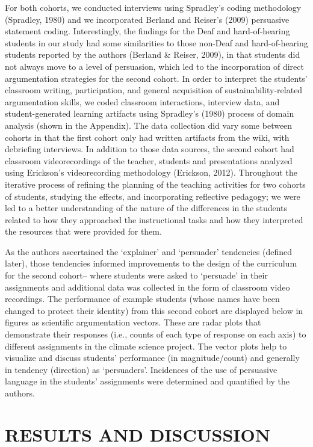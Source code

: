 \documentclass[11.5pt]{sig-alternate} %
\begin{document}
\begin{large}
For both cohorts, we conducted interviews using Spradley’s coding methodology (Spradley, 1980) and we incorporated Berland and Reiser’s (2009) persuasive statement coding. Interestingly, the findings for the Deaf and hard-of-hearing students in our study had some similarities to those non-Deaf and hard-of-hearing students reported by the authors (Berland \& Reiser, 2009), in that students did not always move to a level of persuasion, which led to the incorporation of direct argumentation strategies for the second cohort. In order to interpret the students’ classroom writing, participation, and general acquisition of sustainability-related argumentation skills, we coded classroom interactions, interview data, and student-generated learning artifacts using Spradley’s (1980) process of domain analysis (shown in the Appendix). The data collection did vary some between cohorts in that the first cohort only had written artifacts from the wiki, with debriefing interviews. In addition to those data sources, the second cohort had classroom videorecordings of the teacher, students and presentations analyzed using Erickson’s videorecording methodology (Erickson, 2012). Throughout the iterative process of refining the planning of the teaching activities for two cohorts of students, studying the effects, and incorporating reflective pedagogy; we were led to a better understanding of the nature of the differences in the students related to how they approached the instructional tasks and how they interpreted the resources that were provided for them. 

As the authors ascertained the ‘explainer’ and ‘persuader’ tendencies (defined later), those tendencies informed improvements to the design of the curriculum for the second cohort– where students were asked to ‘persuade’ in their assignments and additional data was collected in the form of classroom video recordings. The performance of example students (whose names have been changed to protect their identity) from this second cohort are displayed below in figures as scientific argumentation vectors. These are radar plots that demonstrate their responses (i.e., counts of each type of response on each axis) to different assignments in the climate science project. The vector plots help to visualize and discuss students’ performance (in magnitude/count) and generally in tendency (direction) as ‘persuaders’. Incidences of the use of persuasive language in the students’ assignments were determined and quantified by the authors.

\section*{RESULTS AND DISCUSSION}


\end{large}
\end{document}
